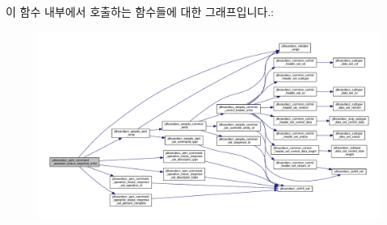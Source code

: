 이 함수 내부에서 호출하는 함수들에 대한 그래프입니다.\+:
\nopagebreak
\begin{figure}[H]
\begin{center}
\leavevmode
\includegraphics[width=350pt]{group__command__operation__status__response_ga89605ff057dba10da9898969c086881b_cgraph}
\end{center}
\end{figure}


